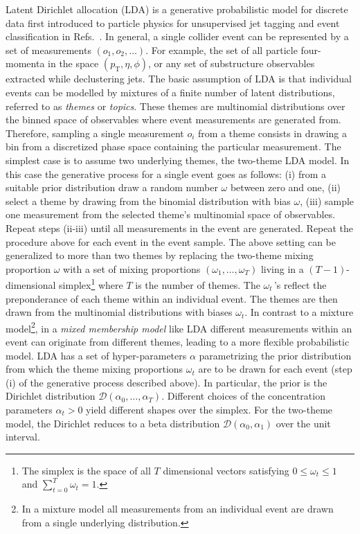 \documentclass[a4paper,11pt]{article}
\begin{document}
\noindent Latent Dirichlet allocation (LDA) is a generative probabilistic model for discrete data first introduced to particle physics for unsupervised jet tagging and event classification in Refs.~\cite{Dillon:2019cqt, 1797846}. In general, a single collider event can be represented by a set of measurements $(o_1,o_2,\ldots)$. For example, the set of all particle four-momenta in the space $(p_\text{T},\eta,\phi)$, or any set of substructure observables extracted while declustering jets. The basic assumption of LDA is that individual events can be modelled by mixtures of a finite number of latent distributions, referred to as {\it themes} or {\it topics}. These themes are multinomial distributions over the binned space of observables where event measurements are generated from. Therefore, sampling a single measurement $o_i$ from a theme consists in drawing a bin from a discretized phase space containing the particular measurement. The simplest case is to assume two underlying themes, the two-theme LDA model. 
In this case the generative process for a single event goes as follows: 
(i) from a suitable prior distribution draw a random number $\omega$ between zero and one, 
(ii) select a theme by drawing from the binomial distribution with bias $\omega$, 
(iii) sample one measurement from the selected theme's multinomial space of observables. 
Repeat steps (ii-iii) until all measurements in the event are generated. 
Repeat the procedure above for each event in the event sample. 
The above setting can be generalized to more than two themes by replacing the two-theme mixing proportion  $\omega$ with a set of mixing proportions $(\omega_1,\ldots,\omega_T)$ living in a $(T-1)$-dimensional simplex\footnote{The simplex is the space of all $T$ dimensional vectors satisfying $0\le\omega_t\le1$ and $\sum_{t=0}^T\omega_t=1$.} where $T$ is the number of themes. The $\omega_t\,$'s reflect the preponderance of each theme within an individual event. The themes are then drawn from the multinomial distributions with biases $\omega_t$. In contrast to a mixture model\footnote{In a mixture model all measurements from an individual event are drawn from a single underlying distribution.}, in a {\it mixed membership model} like LDA different measurements within an event can originate from different themes, leading to a more flexible probabilistic model. LDA has a set of hyper-parameters $\alpha$ parametrizing the prior distribution from which the theme mixing proportions $\omega_t$ are to be drawn for each event (step (i) of the generative process described above). In particular, the prior is the Dirichlet distribution $\mathcal{D}(\alpha_0,\ldots,\alpha_T)$. Different choices of the concentration parameters $\alpha_t>0$ yield different shapes over the simplex. For the two-theme model, the Dirichlet reduces to a beta distribution $\mathcal{D}(\alpha_0,\alpha_1)$ over the unit interval.
\end{document}

